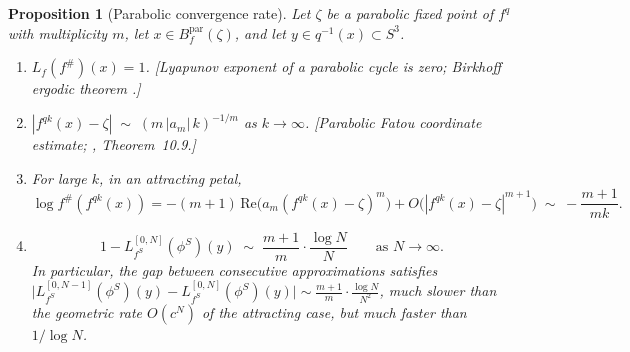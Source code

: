\documentclass[12pt]{article}
\newtheorem{proposition}[theorem]{Proposition}
\theoremstyle{definition}
\newcommand{\fsh}{f^{\#}}            %
\begin{document}
\begin{proposition}[Parabolic convergence rate]\label{prop:parabolic}
  Let $\zeta$ be a parabolic fixed point of $f^q$ with multiplicity $m$,
  let $x \in B_f^{\mathrm{par}}(\zeta)$, and let $y\in q^{-1}(x)\subset S^3$.
  \begin{enumerate}[label=(\roman*)]
    \item $L_f(\fsh)(x) = 1$.
          \textnormal{[Lyapunov exponent of a parabolic cycle is zero;
          Birkhoff ergodic theorem \cite{Birkhoff1931}.]}
    \item $|f^{qk}(x)-\zeta| \;\sim\; (m\,|a_m|\,k)^{-1/m}$ as $k\to\infty$.
          \textnormal{[Parabolic Fatou coordinate estimate; \cite{Milnor2006},
          Theorem~10.9.]}
    \item For large $k$, in an attracting petal,
          \begin{equation}\label{eq:spherical_taylor}
            \log\fsh(f^{qk}(x))
            = -(m+1)\,\mathrm{Re}\!\bigl(a_m(f^{qk}(x)-\zeta)^m\bigr)
              + O\!\bigl(|f^{qk}(x)-\zeta|^{m+1}\bigr)
            \;\sim\; -\frac{m+1}{mk}.
          \end{equation}
    \item \begin{equation}\label{eq:parabolic_rate}
            1 - L_{f^S}^{[0,N]}(\phi^S)(y)
            \;\sim\; \frac{m+1}{m}\cdot\frac{\log N}{N}
            \qquad\text{as }N\to\infty.
          \end{equation}
          In particular, the gap between consecutive approximations satisfies
          $\bigl|L_{f^S}^{[0,N-1]}(\phi^S)(y)-L_{f^S}^{[0,N]}(\phi^S)(y)\bigr|
          \sim \tfrac{m+1}{m}\cdot\tfrac{\log N}{N^2}$,
          much slower than the geometric rate $O(c^N)$ of the attracting
          case, but much faster than $1/\!\log N$.
  \end{enumerate}
\end{proposition}
\end{document}
